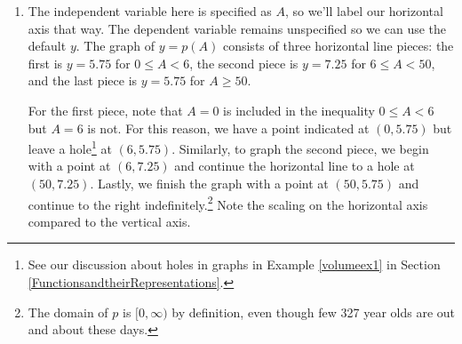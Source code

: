 \documentclass{ximera}
\begin{document}
\begin{example}
\begin{explanation}
\begin{enumerate}
\item   The independent variable here is specified as $A$, so we'll label our horizontal axis that way.  The dependent variable remains unspecified so we can use the default $y$.  The graph of $y = p(A)$ consists of three horizontal line pieces:  the first is $y = 5.75$ for $0 \leq A < 6$, the second piece is $y = 7.25$ for $6 \leq A < 50$, and the last piece is $y = 5.75$ for $A \geq 50$.  

For the first piece, note that $A = 0$ is included in the inequality $0 \leq A < 6$ but $A = 6$ is not.  For this reason, we have a point indicated at $(0, 5.75)$ but leave a hole\footnote{See our discussion about holes in graphs in Example \ref{volumeex1} in Section \ref{FunctionsandtheirRepresentations}.} at $(6, 5.75)$.  Similarly, to graph the second piece, we begin with a point at $(6, 7.25)$ and continue the horizontal line to a hole at $(50, 7.25)$.  Lastly,  we finish the graph with a point at $(50, 5.75)$ and continue to the right indefinitely.\footnote{The domain of $p$ is $[0, \infty)$ by definition, even though few 327 year olds are out and about these days.} Note the scaling on the horizontal axis compared to the vertical axis.


\begin{image}

\end{image}
\end{enumerate}
\end{explanation}
\end{example}
\end{document}
